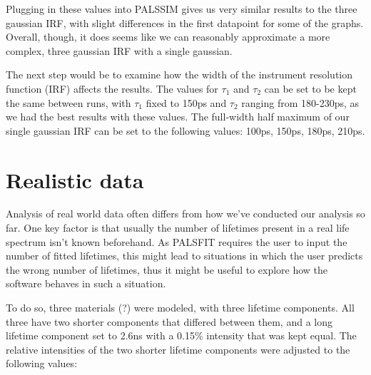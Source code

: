 Plugging in these values into PALSSIM gives us very similar results to the three gaussian IRF, with slight differences in the first datapoint for some of the graphs. Overall, though, it does seems like we can reasonably approximate a more complex, three gaussian IRF with a single gaussian.

The next step would be to examine how the width of the instrument resolution function (IRF) affects the results. The values for $\tau_1$ and $\tau_2$ can be set to be kept the same between runs, with $\tau_1$ fixed to 150ps and $\tau_2$ ranging from 180-230ps, as we had the best results with these values. The full-width half maximum of our single gaussian IRF can be set to the following values: 100ps, 150ps, 180ps, 210ps.

\fi


\section{Realistic data}

Analysis of real world data often differs from how we've conducted our analysis so far. One key factor is that usually the number of lifetimes present in a real life spectrum isn't known beforehand. As PALSFIT requires the user to input the number of fitted lifetimes, this might lead to situations in which the user predicts the wrong number of lifetimes, thus it might be useful to explore how the software behaves in such a situation.

To do so, three materials (?) were modeled, with three lifetime components. All three have two shorter components that differed between them, and a long lifetime component set to 2.6ns with a 0.15\% intensity that was kept equal. The relative intensities of the two shorter lifetime components were adjusted to the following values:

